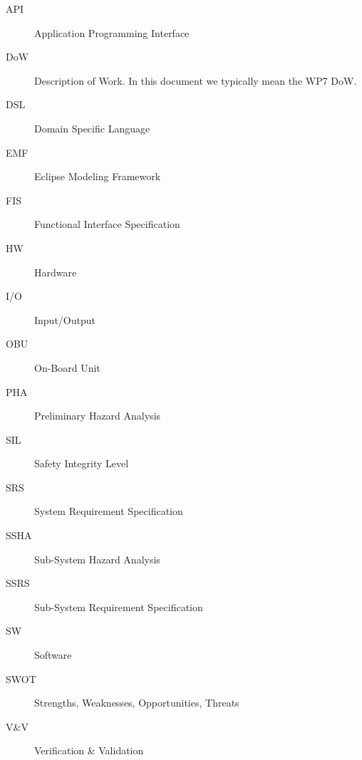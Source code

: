 \begin{description}
\item[API] Application Programming Interface
\item[DoW] Description of Work.  In this document we typically mean the WP7 DoW.
\item[DSL] Domain Specific Language
\item[EMF] Eclipse Modeling Framework
\item[FIS] Functional Interface Specification
\item[HW] Hardware
\item[I/O] Input/Output
\item[OBU] On-Board Unit
\item[PHA] Preliminary Hazard Analysis
\item[SIL] Safety Integrity Level
\item[SRS] System Requirement Specification
\item[SSHA] Sub-System Hazard Analysis
\item[SSRS] Sub-System Requirement Specification
\item[SW] Software
\item[SWOT] Strengths, Weaknesses, Opportunities, Threats
\item[V\&V] Verification \& Validation
\end{description}



